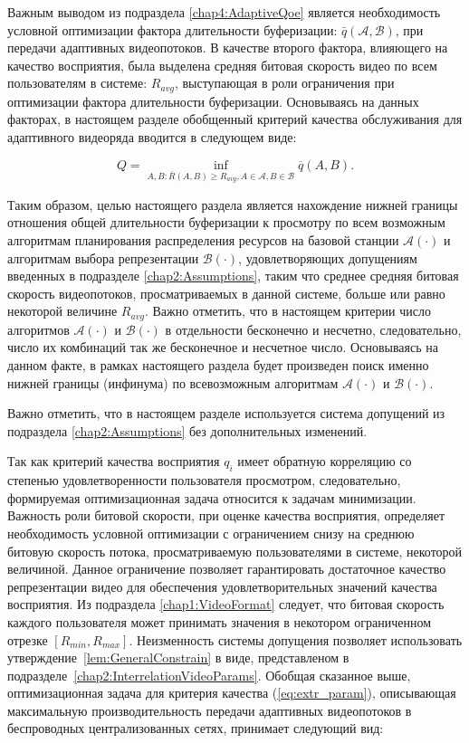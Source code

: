 Важным выводом из подраздела \ref{chap4:AdaptiveQoe} является необходимость условной оптимизации фактора длительности буферизации: $\bar{q}\left(\mathcal{A}, \mathcal{B}\right)$, при передачи адаптивных видеопотоков. В качестве второго фактора, влияющего на качество восприятия, была выделена средняя битовая скорость видео по всем пользователям в системе: $R_{avg}$, выступающая в роли ограничения при оптимизации фактора длительности буферизации. Основываясь на данных факторах, в настоящем разделе обобщенный критерий качества обслуживания для адаптивного видеоряда вводится в следующем виде:

\begin{equation}
Q = \inf\limits_{A,B: \overline{R}\left(A,B\right) \geq R_{avg}, A \in \mathcal{A}, B \in \mathcal{B}} \overline{q}\left(A,B\right).
\label{eq:extr_param}
\end{equation}

Таким образом, целью настоящего раздела является нахождение нижней границы отношения общей длительности буферизации к просмотру по всем возможным алгоритмам планирования распределения ресурсов на базовой станции $\mathcal{A}(\cdot)$ и алгоритмам выбора репрезентации $\mathcal{B}(\cdot)$, удовлетворяющих допущениям введенных в подразделе \ref{chap2:Assumptions}, таким что среднее средняя битовая скорость видеопотоков, просматриваемых в данной системе, больше или равно некоторой величине $R_{avg}$. Важно отметить, что в настоящем критерии число алгоритмов $\mathcal{A}(\cdot)$ и $\mathcal{B}(\cdot)$ в отдельности бесконечно и несчетно, следовательно, число их комбинаций так же бесконечное и несчетное число. Основываясь на данном факте, в рамках настоящего раздела будет произведен поиск именно нижней границы (инфинума) по всевозможным алгоритмам $\mathcal{A}(\cdot)$ и $\mathcal{B}(\cdot)$.

Важно отметить, что в настоящем разделе используется система допущений из подраздела \ref{chap2:Assumptions} без дополнительных изменений.

Так как критерий качества восприятия $q_i$ имеет обратную корреляцию со степенью удовлетворенности пользователя просмотром, следовательно, формируемая оптимизационная задача относится к задачам минимизации. Важность роли битовой скорости, при оценке качества восприятия, определяет необходимость условной оптимизации с ограничением снизу на среднюю битовую скорость потока, просматриваемую пользователями в системе, некоторой величиной. Данное ограничение позволяет гарантировать достаточное качество репрезентации видео для обеспечения удовлетворительных значений качества восприятия. Из подраздела \ref{chap1:VideoFormat} следует, что битовая скорость каждого пользователя может принимать значения в некотором ограниченном отрезке $[R_{min}, R_{max}]$. Неизменность системы допущения позволяет использовать утверждение~\ref{lem:GeneralConstrain} в виде, представленом в подразделе~\ref{chap2:InterrelationVideoParams}. Обобщая сказанное выше, оптимизационная задача для критерия качества (\ref{eq:extr_param}), описывающая максимальную производительность передачи адаптивных видеопотоков в беспроводных централизованных сетях, принимает следующий вид:

